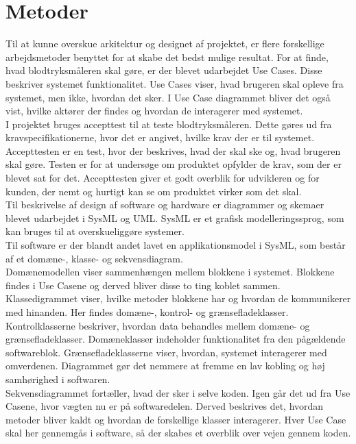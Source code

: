\section{Metoder}
Til at kunne overskue arkitektur og designet af projektet, er flere forskellige arbejdsmetoder benyttet for at skabe det bedst mulige resultat. 
For at finde, hvad blodtryksmåleren skal gøre, er der blevet udarbejdet Use Cases. Disse beskriver systemet funktionalitet. Use Cases viser, hvad brugeren skal opleve fra systemet, men ikke, hvordan det sker. I Use Case diagrammet bliver det også vist, hvilke aktører der findes og hvordan de interagerer med systemet.   \\
I projektet bruges accepttest til at teste blodtryksmåleren. Dette gøres ud fra kravspecifikationerne, hvor det er angivet, hvilke krav der er til systemet. \\Accepttesten er en test, hvor der beskrives, hvad der skal ske og, hvad brugeren skal gøre. Testen er for at undersøge om produktet opfylder de krav, som der er blevet sat for det. Accepttesten giver et godt overblik for udvikleren og for kunden, der nemt og hurtigt kan se om produktet virker som det skal. \\
\newline
Til  beskrivelse af design af software og hardware er diagrammer og skemaer blevet udarbejdet i SysML og UML. SysML er et grafisk modelleringssprog, som kan bruges til at overskueliggøre systemer. \\
Til software er der blandt andet lavet en applikationsmodel i SysML, som består af et domæne-, klasse- og sekvensdiagram. \\
Domænemodellen viser sammenhængen mellem blokkene i systemet. Blokkene findes i Use Casene og derved bliver disse to ting koblet sammen. \\
Klassedigrammet viser, hvilke metoder blokkene har og hvordan de kommunikerer med hinanden. Her findes domæne-, kontrol- og grænsefladeklasser. Kontrolklasserne beskriver, hvordan data behandles mellem domæne- og grænsefladeklasser. Domæneklasser indeholder funktionalitet fra den pågældende softwareblok. Grænsefladeklasserne viser, hvordan, systemet interagerer med omverdenen. Diagrammet gør det nemmere at fremme en lav kobling og høj samhørighed i softwaren.\\
Sekvensdiagrammet fortæller, hvad der sker i selve koden. Igen går det ud fra Use Casene, hvor vægten nu er på softwaredelen. Derved beskrives det, hvordan metoder bliver kaldt og hvordan de forskellige klasser interagerer. Hver Use Case skal her gennemgås i software, så der skabes et overblik over vejen gennem koden.\\
